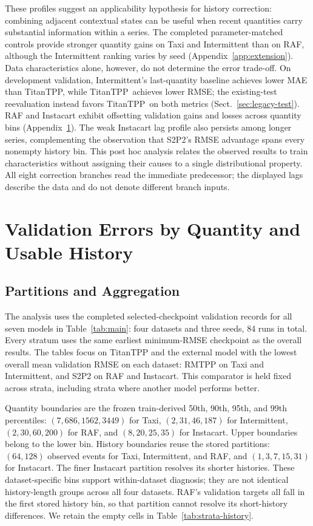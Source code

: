 \documentclass[runningheads]{llncs}
\newcommand{\method}{TitanTPP}
\begin{document}
These profiles suggest an applicability hypothesis for history correction:
combining adjacent contextual states can be useful when recent quantities
carry substantial information within a series. The completed
parameter-matched controls provide stronger quantity gains on Taxi and
Intermittent than on RAF, although the Intermittent ranking varies by seed
(Appendix~\ref{app:extension}). Data characteristics alone, however, do
not determine the error trade-off. On development validation, Intermittent's
last-quantity baseline achieves lower MAE than \method, while \method\
achieves lower RMSE; the existing-test reevaluation instead favors \method\
on both metrics (Sect.~\ref{sec:legacy-test}). RAF and Instacart exhibit
offsetting validation gains and losses across quantity bins
(Appendix~\ref{app:strata}). The weak Instacart lag profile also persists
among longer series, complementing the observation that S2P2's RMSE
advantage spans every nonempty history bin. This post hoc analysis relates
the observed results to train characteristics without assigning their
causes to a single distributional property. All eight correction branches
read the immediate predecessor; the displayed lags describe the data and
do not denote different branch inputs.

\section{Validation Errors by Quantity and Usable History}\label{app:strata}
\subsection{Partitions and Aggregation}
The analysis uses the completed selected-checkpoint validation records for
all seven models in Table~\ref{tab:main}: four datasets and three seeds,
84 runs in total. Every stratum uses the same earliest minimum-RMSE
checkpoint as the overall results. The tables focus on TitanTPP and the
external model with the lowest overall mean validation RMSE on each dataset:
RMTPP on Taxi and Intermittent, and S2P2 on RAF and Instacart. This comparator
is held fixed across strata, including strata where another model performs
better.

Quantity boundaries are the frozen train-derived 50th, 90th, 95th, and
99th percentiles: $(7,686,1562,3449)$ for Taxi, $(2,31,46,187)$ for
Intermittent, $(2,30,60,200)$ for RAF, and $(8,20,25,35)$ for Instacart.
Upper boundaries belong to the lower bin. History boundaries reuse the
stored partitions: $(64,128)$ observed events for Taxi, Intermittent, and
RAF, and $(1,3,7,15,31)$ for Instacart. The finer Instacart partition
resolves its shorter histories. These dataset-specific bins support
within-dataset diagnosis; they are not identical history-length groups
across all four datasets. RAF's validation targets all fall in the first
stored history bin, so that partition cannot resolve its short-history
differences. We retain the empty cells in Table~\ref{tab:strata-history}.
\end{document}
